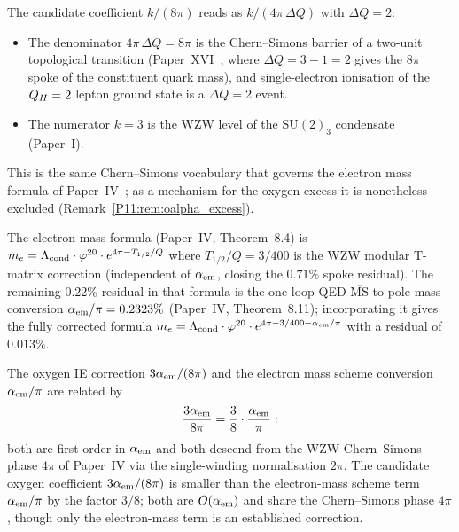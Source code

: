 \begin{remark}
\label{P11:rem:k8pi_origin}
The candidate coefficient $k/(8\pi)$ reads as
$k/(4\pi\,\Delta Q)$ with $\Delta Q = 2$:
\begin{itemize}[noitemsep]
\item The denominator $4\pi\,\Delta Q = 8\pi$ is the Chern--Simons
  barrier of a two-unit topological transition
  (Paper~XVI~\cite{Paper16}, where $\Delta Q = 3-1 = 2$ gives the
  $8\pi$ spoke of the constituent quark mass), and single-electron
  ionisation of the $Q_H=2$ lepton ground state is a $\Delta Q = 2$
  event.
\item The numerator $k=3$ is the WZW level of the $\mathrm{SU}(2)_3$
  condensate (Paper~I).
\end{itemize}
This is the same Chern--Simons vocabulary that governs the electron
mass formula of Paper~IV~\cite{Paper4}; as a mechanism for the oxygen
excess it is nonetheless excluded (Remark~\ref{P11:rem:oalpha_excess}).

The electron mass formula (Paper~IV, Theorem~8.4) %
is $m_e = \Lambda_{\mathrm{cond}}\cdot\varphi^{20}\cdot e^{4\pi - T_{1/2}/Q}$
where $T_{1/2}/Q = 3/400$ is the WZW modular T-matrix correction
(independent of $\alpha_{\mathrm{em}}$, closing the $0.71\%$ spoke residual).
The remaining $0.22\%$ residual in that formula is the
one-loop QED $\overline{\mathrm{MS}}$-to-pole-mass conversion
$\alpha_{\mathrm{em}}/\pi = 0.2323\%$
(Paper~IV, Theorem~8.11); %
incorporating it gives the fully corrected formula
$m_e = \Lambda_{\mathrm{cond}}\cdot\varphi^{20}\cdot e^{4\pi-3/400-\alpha_{\mathrm{em}}/\pi}$
with a residual of $0.013\%$.

The oxygen IE correction $3\alpha_{\mathrm{em}}/(8\pi)$ and the electron mass
scheme conversion $\alpha_{\mathrm{em}}/\pi$ are related by
\begin{equation}
  \frac{3\alpha_{\mathrm{em}}}{8\pi} = \frac{3}{8} \cdot \frac{\alpha_{\mathrm{em}}}{\pi}:
  \label{P11:eq:kalpharelation}
\end{equation}
both are first-order in $\alpha_{\mathrm{em}}$ and both descend from the
WZW Chern--Simons phase $4\pi$ of Paper~IV via the
single-winding normalisation $2\pi$.
The candidate oxygen coefficient $3\alpha_{\mathrm{em}}/(8\pi)$ is smaller than the
electron-mass scheme term $\alpha_{\mathrm{em}}/\pi$ by the factor $3/8$; both are
$O(\alpha_{\mathrm{em}})$ and share the Chern--Simons phase $4\pi$, though only the
electron-mass term is an established correction.
\end{remark}

